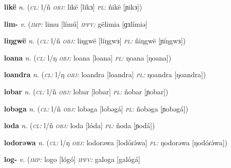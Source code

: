 \newentry
\headword\textbf{likë} 
\ipa{[likɜ]}
\synpos\textit{n.} 
\class(\textit{\textsc{cl:}} {l/ñ}
\object\textit{\textsc{obj:}} likë [likɜ]
\plural\textit{\textsc{pl:}} ñikë [ɲikɜ])

\newentry
\headword\textbf{lim-}  
\ipa{[lím-]}
\synpos\textit{v.} 
\imperative(\textit {\textsc{imp:}} limu [límú]  
\imperfective\textit{\textsc{ipfv:}} gëlimia [ɡɜlímiə]

\newentry
\headword\textbf{liŋgwë} 
\ipa{[líŋgwɜ]}
\synpos\textit{n.} 
\class(\textit{\textsc{cl:}} {l/ñ}
\object\textit{\textsc{obj:}} liŋgwë [líŋgwɜ]
\plural\textit{\textsc{pl:}} ñiŋgwë [ɲíŋgwɜ])

\newentry
\headword\textbf{loana} 
\ipa{[loana]}
\synpos\textit{n.} 
\class(\textit{\textsc{cl:}} {l/ŋ}
\object\textit{\textsc{obj:}} loana [loana]
\plural\textit{\textsc{pl:}} ŋoana [ŋoana])


\newentry
\headword\textbf{loandra} 
\ipa{[loandra]}
\synpos\textit{n.} 
\class(\textit{\textsc{cl:}} {l/ŋ}
\object\textit{\textsc{obj:}} loandra [loandra]
\plural\textit{\textsc{pl:}} ŋoandra [ŋoandra])

\newentry
\headword\textbf{lobar} 
\ipa{[lobar]}
\synpos\textit{n.} 
\class(\textit{\textsc{cl:}} {l/ñ}
\object\textit{\textsc{obj:}} lobar [lobar]
\plural\textit{\textsc{pl:}} ñobar [ɲobar])

\newentry
\headword\textbf{lobəga} 
\ipa{[lobəgá]}
\synpos\textit{n.} 
\class(\textit{\textsc{cl:}} {l/ñ}
\object\textit{\textsc{obj:}} lobəga [lobəgá]
\plural\textit{\textsc{pl:}} ñobəga [ɲobəgá])

\newentry
\headword\textbf{loda} 
\ipa{[lóda]}
\synpos\textit{n.} 
\class(\textit{\textsc{cl:}} {l/ñ}
\object\textit{\textsc{obj:}} loda [lóda]
\plural\textit{\textsc{pl:}} ñoda [ɲodá])

\newentry
\headword\textbf{lodorəwa} 
\ipa{[lodóɾə́wa]}
\synpos\textit{n.} 
\class(\textit{\textsc{cl:}} {l/ŋ}
\object\textit{\textsc{obj:}} lodorəwa [lodóɾə́wa]
\plural\textit{\textsc{pl:}} ŋodorəwa [ŋodóɾə́wa])


\newentry
\headword\textbf{log-}  
\ipa{[lóg-]}
\synpos\textit{v.} 
\imperative(\textit {\textsc{imp:}} logo [lógó]  
\imperfective\textit{\textsc{ipfv:}} galoga [galógá]

